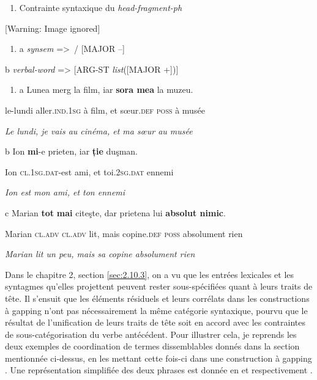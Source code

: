 \begin{enumerate}
\item \label{bkm:Ref299907665}Contrainte syntaxique du \textit{head-fragment-ph} 


\end{enumerate}
  [Warning: Image ignored] %
 


\begin{enumerate}
\item \label{bkm:Ref299908583}a  \textit{synsem} ={\textgreater}~/ [MAJOR --] 


\end{enumerate}
  b  \textit{verbal-word} ={\textgreater} [ARG-ST \textit{list}([MAJOR +])]  


\begin{enumerate}
\item \label{bkm:Ref299909081}a  Lunea merg la film, iar \textbf{sora mea} la muzeu.


\end{enumerate}
le-lundi aller.\textsc{ind.1sg} à film, et s{\oe}ur.\textsc{def poss} à musée 

    \textit{Le lundi, je vais au cinéma, et ma s{\oe}ur au musée } 

  b  Ion \textbf{mi}-e prieten, iar \textbf{ție} duşman.

    Ion \textsc{cl.1sg.dat-}est ami, et toi\textsc{.2sg.dat} ennemi 

    \textit{Ion est mon ami, et ton ennemi } 

  c  Marian \textbf{tot} \textbf{mai} citeşte, dar prietena lui \textbf{absolut nimic}.

Marian \textsc{cl.adv cl.adv} lit, mais copine.\textsc{def poss} absolument rien 

{\itshape
Marian lit un peu, mais sa copine absolument rien} 

Dans le chapitre 2, section \ref{sec:2.10.3}, on a vu que les entrées lexicales et les syntagmes qu'elles projettent peuvent rester sous-spécifiées quant à leurs traits de tête. Il s'ensuit que les éléments résiduels et leurs corrélats dans les constructions à gapping n'ont pas nécessairement la même catégorie syntaxique, pourvu que le résultat de l'unification de leurs traits de tête soit en accord avec les contraintes de sous-catégorisation du verbe antécédent. Pour illustrer cela, je reprends les deux exemples de coordination de termes dissemblables donnés dans la section mentionnée ci-dessus, en les mettant cette fois-ci dans une construction à gapping . Une représentation simplifiée des deux phrases est donnée en  et respectivement .  


